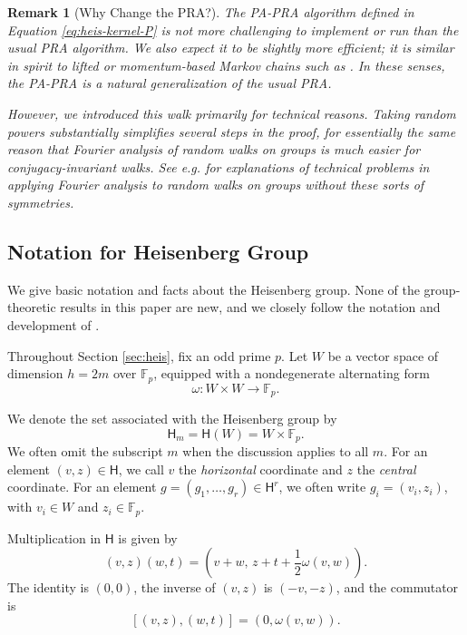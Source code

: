 \documentclass[11pt, reqno]{amsart}
\numberwithin{equation}{section}
\newtheorem{remark}[theorem]{Remark}
\newcommand{\Fp}{\mathbb F_p}
\newcommand{\Heis}{\mathsf H}
\begin{document}
\begin{remark} [Why Change the PRA?]
The PA-PRA algorithm defined in Equation \eqref{eq:heis-kernel-P} is not more challenging to implement or run than the usual PRA algorithm. We also expect it to be slightly more efficient; it is similar in spirit to lifted or momentum-based Markov chains such as \cite{DiaconisHolmesNeal2000}. In these senses, the PA-PRA is a natural generalization of the usual PRA.

However, we introduced this walk primarily for technical reasons. Taking random powers substantially simplifies several steps in the proof, for essentially the same reason that Fourier analysis of random walks on groups is much easier for conjugacy-invariant walks. See \textit{e.g.} \cite{Diaconis1988,DiaconisShahshahani1981} for explanations of technical problems in applying Fourier analysis to random walks on groups without these sorts of symmetries.
\end{remark}

\subsection{Notation for Heisenberg Group}

We give basic notation and facts about the Heisenberg group. None of the group-theoretic results in this paper are new, and we closely follow the notation and development of \cite{Misaghian2010}.

Throughout Section \ref{sec:heis}, fix an odd prime \(p\).  Let \(W\) be a vector space
of dimension \(h=2m\) over \(\Fp\), equipped with a nondegenerate alternating
form
\[
    \omega:W\times W\to\Fp.
\]

We denote the set associated with the Heisenberg group by
\[
    \Heis_{m}=\Heis(W)=W\times\Fp.
\]
We often omit the subscript $m$ when the discussion applies to all $m$. For an element $(v,z)\in\Heis$, we call $v$ the \textit{horizontal} coordinate and $z$ the \textit{central} coordinate. For an element \(g=(g_1,\ldots,g_r)\in\Heis^r\), we often write
\(g_i=(v_i,z_i)\), with \(v_i\in W\) and \(z_i\in\mathbb F_p\).


Multiplication in $\Heis$ is given by
\begin{equation}\label{eq:heis-law}
    (v,z)(w,t)=\left(v+w,\,z+t+\frac12\omega(v,w)\right).
\end{equation}
The identity is \((0,0)\), the inverse of \((v,z)\) is \((-v,-z)\), and the commutator is
\[
    [(v,z),(w,t)]=(0,\omega(v,w)).
\]
\end{document}
